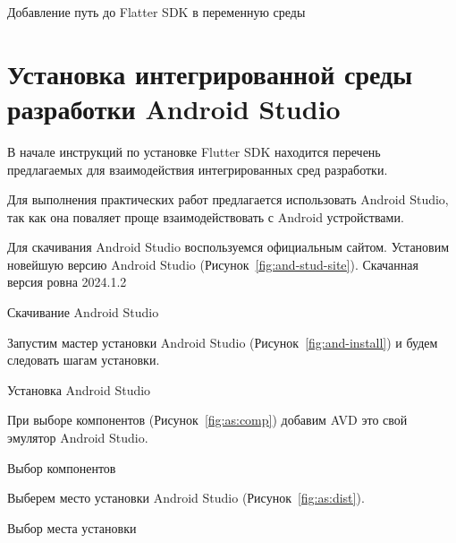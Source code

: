 \begin{image}
	\caption{Добавление путь до Flatter SDK в переменную среды}
	\label{fig:install:path}
\end{image}


\clearpage

\section{Установка интегрированной среды разработки Android Studio}

В начале инструкций по установке Flutter SDK находится перечень предлагаемых
для взаимодействия интегрированных сред разработки.\par
Для выполнения практических работ предлагается использовать Android Studio,
так как она поваляет проще взаимодействовать с Android устройствами.\par
Для скачивания Android Studio воспользуемся официальным сайтом.
Установим новейшую версию Android Studio (Рисунок~\ref{fig:and-stud-site}).
Скачанная версия ровна 2024.1.2


\begin{image}
	\caption{Скачивание Android Studio}
	\label{fig:and-stud-site}
\end{image}

\clearpage

Запустим мастер установки Android Studio (Рисунок~\ref{fig:and-install}) и будем следовать шагам установки.

\begin{image}
	\caption{Установка Android Studio}
	\label{fig:and-install}
\end{image}



При выборе компонентов (Рисунок~\ref{fig:as:comp}) добавим AVD это свой эмулятор  Android Studio.

\begin{image}
	\caption{Выбор компонентов}
	\label{fig:as:comp}
\end{image}
\clearpage

Выберем место установки Android Studio (Рисунок~\ref{fig:as:dist}).

\begin{image}
	\caption{Выбор места установки}
	\label{fig:as:dist}
\end{image}


